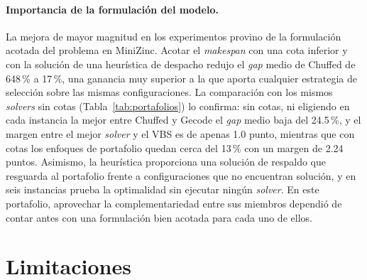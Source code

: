 \paragraph{Importancia de la formulación del modelo.} La mejora de mayor
magnitud en los experimentos provino de la formulación acotada del problema en
MiniZinc. Acotar el \textit{makespan} con una cota inferior y con la solución de
una heurística de despacho redujo el \textit{gap} medio de Chuffed de 648\,\% a
17\,\%, una ganancia muy superior a la que aporta cualquier estrategia de
selección sobre las mismas configuraciones. La comparación con los mismos
\textit{solvers} sin cotas (Tabla~\ref{tab:portafolios}) lo confirma: sin
cotas, ni eligiendo en cada instancia la mejor entre Chuffed y Gecode el
\textit{gap} medio baja del 24.5\,\%, y el margen entre el mejor
\textit{solver} y el VBS es de apenas 1.0 punto, mientras que con cotas los
enfoques de portafolio quedan cerca del 13\,\% con un margen de 2.24 puntos.
Asimismo, la heurística proporciona
una solución de respaldo que resguarda al portafolio frente a configuraciones
que no encuentran solución, y en seis instancias prueba la optimalidad sin
ejecutar ningún \textit{solver}. En este portafolio, aprovechar la
complementariedad entre sus miembros dependió de contar antes con una
formulación bien acotada para cada uno de ellos.

\section{Limitaciones}
\label{sec:limitaciones}

